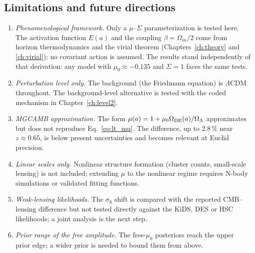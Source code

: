 \subsection{Limitations and future directions}
\begin{enumerate}
\item \emph{Phenomenological framework.} Only a $\mu$--$\Sigma$ parameterization is tested here. The activation function $E(a)$ and the coupling
$\beta=\Omega_m/2$ come from horizon thermodynamics and the virial theorem (Chapters~\ref{ch:theory} and \ref{ch:virial}); no covariant action is
assumed. The results stand independently of that derivation: any model with $\mu_0\approx-0.135$ and $\Sigma=1$ faces the same tests.
\item \emph{Perturbation level only.} The background (the Friedmann equation) is $\Lambda$CDM throughout. The background-level alternative is
tested with the coded mechanism in Chapter~\ref{ch:level2}.
\item \emph{MGCAMB approximation.} The form $\mu(a)=1+\mu_0\Omega_{\rm DE}(a)/\Omega_\Lambda$ approximates but does not reproduce
Eq.~\eqref{eq:lt_mu}. The difference, up to $2.8\,\%$ near $z\approx0.65$, is below present uncertainties and becomes relevant at Euclid precision.
\item \emph{Linear scales only.} Nonlinear structure formation (cluster counts, small-scale lensing) is not included; extending $\mu$ to the
nonlinear regime requires N-body simulations or validated fitting functions.
\item \emph{Weak-lensing likelihoods.} The $\sigma_8$ shift is compared with the reported CMB--lensing difference but not tested directly against
the KiDS, DES or HSC likelihoods; a joint analysis is the next step.
\item \emph{Prior range of the free amplitude.} The free-$\mu_0$ posteriors reach the upper prior edge; a wider prior is needed to bound them from
above.
\end{enumerate}


